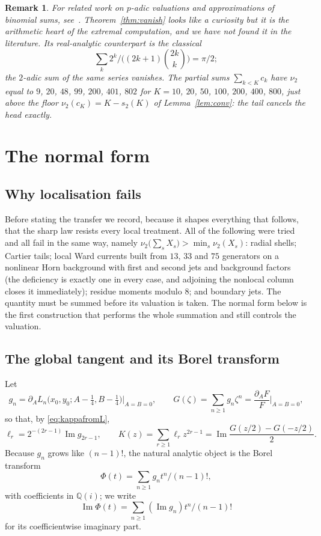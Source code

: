\documentclass[10pt,a4paper]{amsart}
\newtheorem{remark}[theorem]{Remark}
\begin{document}
\begin{remark}
For related work on $p$-adic valuations and approximations of binomial sums, see~\cite{AidagulovAlekseyev,ZhangYuan}.  Theorem~\ref{thm:vanish} looks like a curiosity but it is the arithmetic heart of the extremal computation, and we have not found it in the literature.  Its real-analytic counterpart is the classical
\[
\sum_k2^k/\bigl((2k+1)\binom{2k}k\bigr)=\pi/2;
\]
the $2$-adic sum of the same series vanishes.  The partial sums $\sum_{k<K}c_k$ have $\nu_2$ equal to $9$, $20$, $48$, $99$, $200$, $401$, $802$ for $K=10$, $20$, $50$, $100$, $200$, $400$, $800$, just above the floor $\nu_2(c_K)=K-s_2(K)$ of Lemma~\ref{lem:conv}: the tail cancels the head exactly.
\end{remark}

\section{The normal form}\label{sec:normalform}

\subsection{Why localisation fails}

Before stating the transfer we record, because it shapes everything that follows, that the sharp law resists every local treatment.  All of the
following were tried and all fail in the same way, namely $\nu_2\bigl(\sum_sX_s\bigr)>\min_s\nu_2(X_s)$: radial shells; Cartier tails; local Ward currents built from $13$, $33$ and $75$ generators on a nonlinear Horn background with first and second jets and background factors (the
deficiency is exactly one in every case, and adjoining the nonlocal column closes it immediately); residue moments modulo $8$; and boundary jets.  The quantity must be summed before its valuation is taken.  The normal form below is the first construction that performs the whole summation and still controls the valuation.

\subsection{The global tangent and its Borel transform}

Let
\[
  g_n=\partial_AL_n\bigl(x_0,y_0;A-\tfrac14,B-\tfrac14\bigr)\Big|_{A=B=0},
  \qquad
  G(\zeta)=\sum_{n\ge1}g_n\zeta^n=\frac{\partial_AF}F\bigg|_{A=B=0},
\]
so that, by \eqref{eq:kappafromL},
\begin{equation}\label{eq:ltangent}
  \ell_r=2^{-(2r-1)}\operatorname{Im}g_{2r-1},\qquad   K(z)=\sum_{r\ge1}\ell_rz^{2r-1}      =\operatorname{Im}\frac{G(z/2)-G(-z/2)}2 .
\end{equation}
Because $g_n$ grows like $(n-1)!$, the natural analytic object is the Borel transform 
\[
\Phi(t)=\sum_{n\ge1}g_nt^n/(n-1)!, 
\]
with coefficients in $\mathbb Q(i)$; we write 
\[
\operatorname{Im}\Phi(t)=\sum_{n\ge1}(\operatorname{Im}g_n)t^n/(n-1)!
\]
for its coefficientwise imaginary part.
\end{document}
